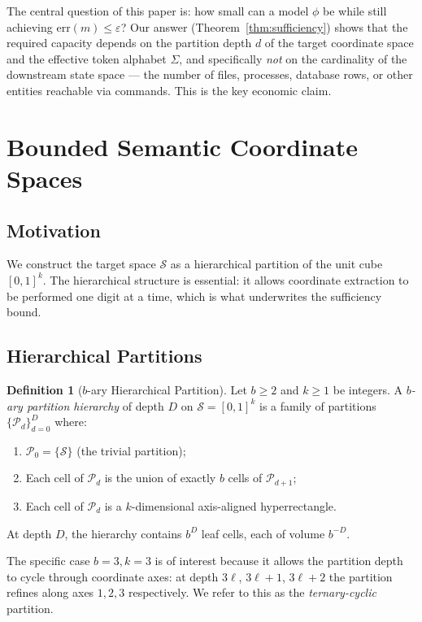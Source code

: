 \documentclass[11pt,twocolumn,a4paper]{article}
\theoremstyle{definition}
\newtheorem{definition}[theorem]{Definition}
\theoremstyle{remark}
\newcommand{\Sc}{\mathcal{S}}
\begin{document}
The central question of this paper is: how small can a model $\phi$ be while still achieving $\mathrm{err}(m) \leq \varepsilon$? Our answer (Theorem~\ref{thm:sufficiency}) shows that the required capacity depends on the partition depth $d$ of the target coordinate space and the effective token alphabet $\Sigma$, and specifically \emph{not} on the cardinality of the downstream state space --- the number of files, processes, database rows, or other entities reachable via commands. This is the key economic claim.

\section{Bounded Semantic Coordinate Spaces}
\label{sec:coord}

\subsection{Motivation}

We construct the target space $\Sc$ as a hierarchical partition of the unit cube $[0,1]^k$. The hierarchical structure is essential: it allows coordinate extraction to be performed one digit at a time, which is what underwrites the sufficiency bound.

\subsection{Hierarchical Partitions}

\begin{definition}[$b$-ary Hierarchical Partition]
\label{def:partition}
Let $b \geq 2$ and $k \geq 1$ be integers. A \emph{$b$-ary partition hierarchy} of depth $D$ on $\Sc = [0,1]^k$ is a family of partitions $\{\mathcal{P}_d\}_{d=0}^D$ where:
\begin{enumerate}
    \item $\mathcal{P}_0 = \{\Sc\}$ (the trivial partition);
    \item Each cell of $\mathcal{P}_d$ is the union of exactly $b$ cells of $\mathcal{P}_{d+1}$;
    \item Each cell of $\mathcal{P}_d$ is a $k$-dimensional axis-aligned hyperrectangle.
\end{enumerate}
At depth $D$, the hierarchy contains $b^D$ leaf cells, each of volume $b^{-D}$.
\end{definition}

The specific case $b = 3, k = 3$ is of interest because it allows the partition depth to cycle through coordinate axes: at depth $3\ell$, $3\ell+1$, $3\ell+2$ the partition refines along axes $1, 2, 3$ respectively. We refer to this as the \emph{ternary-cyclic} partition.
\end{document}
